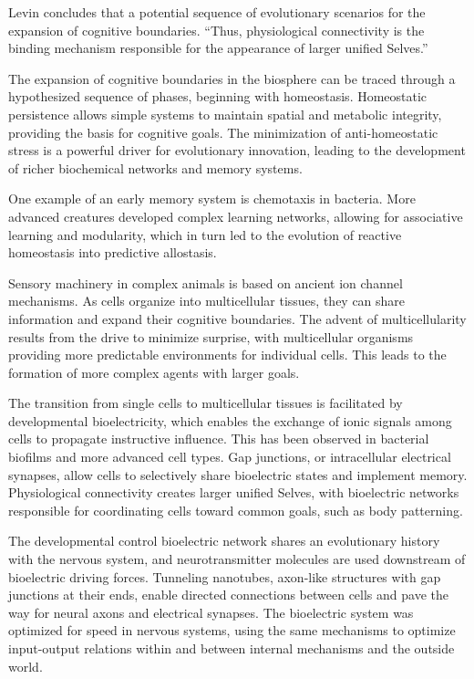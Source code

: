 Levin concludes that a potential sequence of evolutionary scenarios for the expansion of cognitive boundaries.
“Thus, physiological connectivity is the binding mechanism responsible for the appearance of larger unified Selves.”

The expansion of cognitive boundaries in the biosphere can be traced through a hypothesized sequence of phases, beginning with homeostasis. Homeostatic persistence allows simple systems to maintain spatial and metabolic integrity, providing the basis for cognitive goals. The minimization of anti-homeostatic stress is a powerful driver for evolutionary innovation, leading to the development of richer biochemical networks and memory systems.

One example of an early memory system is chemotaxis in bacteria. More advanced creatures developed complex learning networks, allowing for associative learning and modularity, which in turn led to the evolution of reactive homeostasis into predictive allostasis.

Sensory machinery in complex animals is based on ancient ion channel mechanisms. As cells organize into multicellular tissues, they can share information and expand their cognitive boundaries. The advent of multicellularity results from the drive to minimize surprise, with multicellular organisms providing more predictable environments for individual cells. This leads to the formation of more complex agents with larger goals.

The transition from single cells to multicellular tissues is facilitated by developmental bioelectricity, which enables the exchange of ionic signals among cells to propagate instructive influence. This has been observed in bacterial biofilms and more advanced cell types. Gap junctions, or intracellular electrical synapses, allow cells to selectively share bioelectric states and implement memory. Physiological connectivity creates larger unified Selves, with bioelectric networks responsible for coordinating cells toward common goals, such as body patterning.

The developmental control bioelectric network shares an evolutionary history with the nervous system, and neurotransmitter molecules are used downstream of bioelectric driving forces. Tunneling nanotubes, axon-like structures with gap junctions at their ends, enable directed connections between cells and pave the way for neural axons and electrical synapses. The bioelectric system was optimized for speed in nervous systems, using the same mechanisms to optimize input-output relations within and between internal mechanisms and the outside world.

